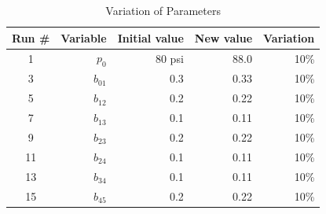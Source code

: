 \documentclass[titlepage,12pt,onehalfspacing]{article}
\begin{document}
\begin{table}[h]
\begin{center}
\caption{Variation of Parameters}
\begin{tabular}{|c|r|r|r|r|}
\hline
{\bf Run \#} & {\bf Variable} & {\bf Initial value} & {\bf New value} & {\bf Variation} \\
\hline
         1 &     $p_0$ &     80 psi &       88.0 &       10\% \\

 \hline
         3 &  $b_{01}$ &        0.3 &       0.33 &       10\% \\

 \hline
         5 &  $b_{12}$ &        0.2 &       0.22 &       10\% \\

\hline
         7 &  $b_{13}$ &        0.1 &       0.11 &       10\% \\

 \hline
         9 &  $b_{23}$ &        0.2 &       0.22 &       10\% \\

\hline
        11 &  $b_{24}$ &        0.1 &       0.11 &       10\% \\

\hline
        13 &  $b_{34}$ &        0.1 &       0.11 &       10\% \\

 \hline
        15 &  $b_{45}$ &        0.2 &       0.22 &       10\% \\

 \hline
\end{tabular}
\end{center}
\end{table}
\end{document}
